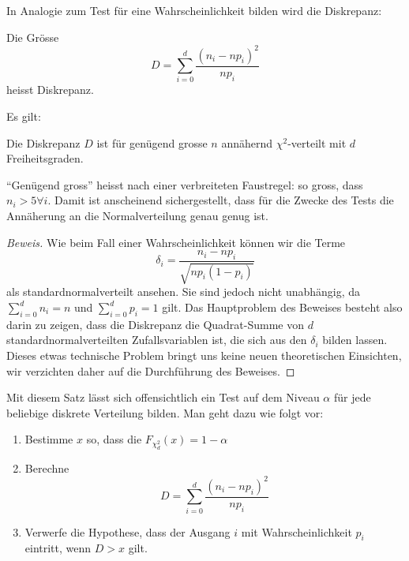In Analogie zum Test für eine Wahrscheinlichkeit bilden wird die
Diskrepanz:
\begin{definition}Die Grösse
\begin{equation}
D=\sum_{i=0}^d\frac{(n_i-np_i)^2}{np_i} \label{formel-diskrepanz}
\end{equation}
heisst Diskrepanz.
\end{definition}
Es gilt:
\begin{satz}[Pearson] Die Diskrepanz $D$ ist für genügend grosse
$n$ annähernd $\chi^2$-verteilt mit $d$ Freiheitsgraden.
\end{satz}
``Genügend gross'' heisst nach einer verbreiteten Faustregel: so
gross, dass $n_i>5\forall i$.
Damit ist anscheinend sichergestellt,
dass für die Zwecke des Tests die Annäherung an die Normalverteilung
genau genug ist.
\begin{proof}[Beweis]
Wie beim Fall einer Wahrscheinlichkeit können wir die Terme
\[
\delta_i=\frac{n_i-np_i}{\sqrt{np_i(1-p_i)}}
\]
als standardnormalverteilt ansehen.
Sie sind jedoch nicht
unabhängig, da $\sum_{i=0}^d n_i=n$ und $\sum_{i=0}^dp_i=1$
gilt.
Das Hauptproblem des Beweises besteht also darin zu zeigen,
dass die Diskrepanz die Quadrat-Summe von $d$ standardnormalverteilten
Zufallsvariablen ist, die sich aus den $\delta_i$ bilden lassen.
Dieses etwas technische Problem bringt uns keine neuen theoretischen
Einsichten, wir verzichten daher auf die Durchführung des Beweises.
\end{proof}

Mit diesem Satz lässt sich offensichtlich ein Test auf dem Niveau
$\alpha$ für jede
beliebige diskrete Verteilung bilden.
Man geht dazu wie folgt vor:
\begin{enumerate}
\item Bestimme $x$ so, dass die $F_{\chi_{d}^2}(x)=1-\alpha$
\item Berechne 
\[
D=\sum_{i=0}^d\frac{(n_i-np_i)^2}{np_i}
\]
\item Verwerfe die Hypothese, dass der Ausgang $i$ mit Wahrscheinlichkeit
$p_i$ eintritt, wenn $D>x$ gilt.
\end{enumerate}

